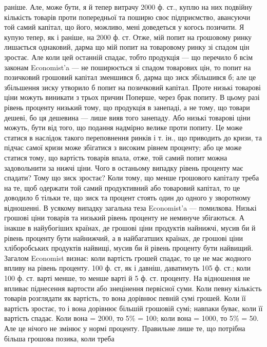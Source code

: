 \parcont{}  %
раніше. Але, може бути, я й тепер витрачу 2000 ф. ст., куплю на них подвійну
кількість товарів проти попередньої та поширю своє підприємство, авансуючи
той самий капітал, що його, можливо, мені доведеться у когось позичити. Я купую
тепер, як і раніше, на 2000 ф. ст. Отже, мій попит на грошовому ринку лишається
однаковий, дарма що мій попит на товаровому ринку зі спадом цін зростає.
Але коли цей останній спадає, тобто продукція — що перечило б всім законам
Economist'a — не поширюється зі спадом товарових цін, то попит на
позичковий грошовий капітал зменшився б, дарма що зиск збільшився б; але
це збільшення зиску утворило б попит на позичковий капітал. Проте низькі
товарові ціни можуть виникати з трьох причин Поперше, через брак попиту.
В цьому разі рівень проценту низький тому, що продукція в занепаді, а не
тому, що товари дешеві, бо ця дешевина — лише вияв того занепаду. Або
низькі товарові ціни можуть, бути від того, що подання надмірно велике проти
попиту. Це може статися в наслідок такого переповнення ринків і т. ін.,
що приводить до кризи, та підчас самої кризи може збігатися з високим рівнем
проценту; або це може статися тому, що вартість товарів впала, отже, той
самий попит можна задовольнити за нижчі ціни. Чого в останьому випадку рівень
проценту має спадати? Тому що зиск зростає? Коли тому, що менше грошового
капіталу треба на те, щоб одержати той самий продуктивний або товаровий
капітал, то це доводило б тільки те, що зиск та процент стоять один до одного
у зворотному відношенні. В усякому випадку загальна теза Economist’a — помилкова.
Низькі грошові ціни товарів та низький рівень проценту не неминуче збігаються.
А інакше в найубогіших країнах, де грошові ціни продуктів найнижчі,
мусив би й рівень проценту бути найнижчий, а в найбагатших країнах, де
грошові ціни хліборобських продуктів найвищі, мусив би й рівень проценту
бути найвищий. Загалом Economist визнає: коли вартість грошей спадає, то це
не має жодного впливу на рівень проценту. 100 ф. ст, як і давніш, даватимуть
105 ф. ст.; коли 100 ф. ст. варті менше, то менше варті й 5 ф. ст. проценту.
На відношення не впливає піднесення вартости або знецінення первісної суми.
Коли певну кількість товарів розглядати як вартість, то вона дорівнює певній
сумі грошей. Коли її вартість зростає, то і вона дорівнює більшій грошовій
сумі; навпаки буває, коли її вартість спадає. Коли вона = 2000, то 5\% =
100; коли вона = 1000, то 5\% = 50. Але це нічого не змінює у нормі проценту.
Правильне лише те, що потрібна більша грошова позика, коли треба
